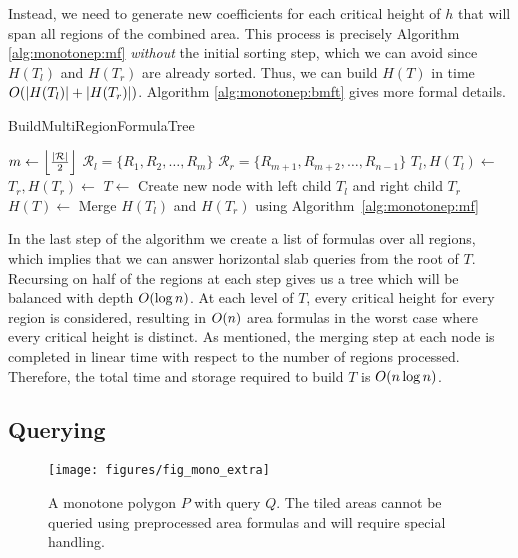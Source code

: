 Instead, we need to generate new coefficients for each critical height of $h$ that will span all regions of the combined area. This process is precisely Algorithm \ref{alg:monotonep:mf} \emph{without} the initial sorting step, which we can avoid since $H(T_l)$ and $H(T_r)$ are already sorted.  Thus, we can build $H(T)$ in time $O\!\left(|H(T_l)| + |H(T_r)|\right)$.  Algorithm \ref{alg:monotonep:bmft} gives more formal details.

\begin{algorithm}
\LinesNumbered
\DontPrintSemicolon
\caption{BuildMultiRegionFormulaTree}
\label{alg:monotonep:bmft}
\BlankLine
{}
$m \gets \left\lfloor\frac{|\mathcal{R}|}{2}\right\rfloor$\;
$\mathcal{R}_l = \{ R_1, R_2, \ldots, R_m \}$\;
$\mathcal{R}_r = \{ R_{m+1}, R_{m+2}, \ldots, R_{n-1} \}$\;
$T_l, H(T_l) \gets $ \;
$T_r, H(T_r) \gets $ \;
$T \gets $ Create new node with left child $T_l$ and right child $T_r$\;
$H(T) \gets $ Merge $H(T_l)$ and $H(T_r)$ using Algorithm~\ref{alg:monotonep:mf}\;
\BlankLine
{}
\end{algorithm}

In the last step of the algorithm we create a list of formulas over all regions, which implies that we can answer horizontal slab queries from the root of $T$. Recursing on half of the regions at each step gives us a tree which will be balanced with depth $O\!\left(\log{n}\right)$. At each level of $T$, every critical height for every region is considered, resulting in $O\!\left(n\right)$ area formulas in the worst case where every critical height is distinct. As mentioned, the merging step at each node is completed in linear time with respect to the number of regions processed. Therefore, the total time and storage required to build $T$ is $O\!\left(n\log{n}\right)$.  


\subsection{Querying}
\label{:monotonep:rect:querying}

\begin{figure}[t]
\begin{center}
  \texttt{[image: figures/fig\_mono\_extra]}
  \caption[Querying details for a monotone polygon]{A monotone polygon $P$ with query $Q$. The tiled areas cannot be queried using preprocessed area formulas and will require special handling.}
  \label{fig:monotonep:extra}
\end{center}
\end{figure}

